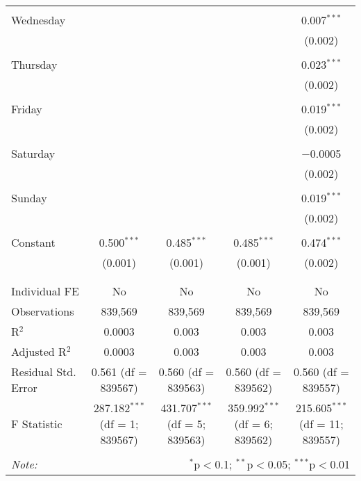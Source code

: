 \documentclass[
]{article}
\begin{document}
\begin{table}[!htbp]
{\begin{tabular}{@{\extracolsep{5pt}}lcccc}
  & & & & \\ 
 Wednesday &  &  &  & 0.007$^{***}$ \\ 
  &  &  &  & (0.002) \\ 
  & & & & \\ 
 Thursday &  &  &  & 0.023$^{***}$ \\ 
  &  &  &  & (0.002) \\ 
  & & & & \\ 
 Friday &  &  &  & 0.019$^{***}$ \\ 
  &  &  &  & (0.002) \\ 
  & & & & \\ 
 Saturday &  &  &  & $-$0.0005 \\ 
  &  &  &  & (0.002) \\ 
  & & & & \\ 
 Sunday &  &  &  & 0.019$^{***}$ \\ 
  &  &  &  & (0.002) \\ 
  & & & & \\ 
 Constant & 0.500$^{***}$ & 0.485$^{***}$ & 0.485$^{***}$ & 0.474$^{***}$ \\ 
  & (0.001) & (0.001) & (0.001) & (0.002) \\ 
  & & & & \\ 
\hline \\[-1.8ex] 
Individual FE & No & No & No & No \\ 
Observations & 839,569 & 839,569 & 839,569 & 839,569 \\ 
R$^{2}$ & 0.0003 & 0.003 & 0.003 & 0.003 \\ 
Adjusted R$^{2}$ & 0.0003 & 0.003 & 0.003 & 0.003 \\ 
Residual Std. Error & 0.561 (df = 839567) & 0.560 (df = 839563) & 0.560 (df = 839562) & 0.560 (df = 839557) \\ 
F Statistic & 287.182$^{***}$ (df = 1; 839567) & 431.707$^{***}$ (df = 5; 839563) & 359.992$^{***}$ (df = 6; 839562) & 215.605$^{***}$ (df = 11; 839557) \\ 
\hline 
\hline \\[-1.8ex] 
\textit{Note:}  & \multicolumn{4}{r}{$^{*}$p$<$0.1; $^{**}$p$<$0.05; $^{***}$p$<$0.01} \\ 
\end{tabular}
} 
\end{table} 
\newpage
\end{document}
